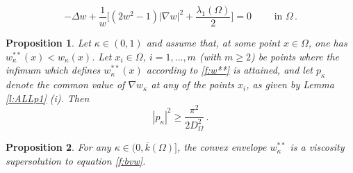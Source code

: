\documentclass[10pt,a4paper]{amsart}
\newtheorem{proposition}{Proposition}
\def\Om{\Omega}
\def\k{\kappa}
\begin{document}
\begin{equation}\label{f:bvw}
 - \Delta w + \frac{1}{w} \big [ ( 2 w ^ 2 -1 ) |\nabla w| ^ 2 +\frac{\lambda _ 1 (\Om) }{2} \big ] = 0 \qquad \text{ in } \Om\,. 
 \end{equation} 

\begin{proposition}\label{p:key}  Let $\k \in (0, 1)$ and assume that, at some point $x \in \Om$, one has $w _\k   ^ { **}  (x) < w _\k  (x) $. 
Let $x _i \in \Om$, $i = 1, \dots, m$  (with $m \geq 2$) be points where the infimum which defines   $w _\k   ^ { **}  (x)$ according to
\eqref{f:w**} is attained, and let $p_\k$ 
denote  the common value of  $\nabla w _\k$ at any of the points   $x_i$, as given by Lemma  \ref{l:ALLp1}  (i). 
Then 
 $$|p_\k | ^ 2 \geq  \frac{\pi ^ 2}{2 D _\Om ^ 2} \,.$$   
\end{proposition} 

\begin{proposition}\label{p:viscosuper}   
For any $\k \in (0, \overline k (\Om)]$, the convex envelope $w  _\k ^{**}$ is a viscosity  supersolution  to   equation \eqref{f:bvw}. 
  \end{proposition} 
\end{document}
